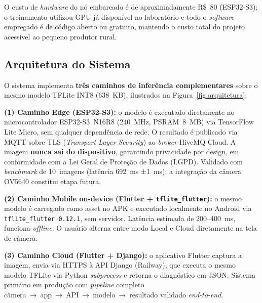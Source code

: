 \documentclass[12pt]{article}
\begin{document}
O custo de \textit{hardware} do nó embarcado é de aproximadamente R\$~80 (ESP32-S3);
o treinamento utilizou GPU já disponível no laboratório e todo o \textit{software}
empregado é de código aberto ou gratuito, mantendo o custo total do projeto acessível
ao pequeno produtor rural.

\subsection{Arquitetura do Sistema}

O sistema implementa \textbf{três caminhos de inferência complementares} sobre o
mesmo modelo TFLite INT8 (638~KB), ilustrados na Figura~\ref{fig:arquitetura}:

\textbf{(1) Caminho Edge (ESP32-S3):} o modelo é executado diretamente no
microcontrolador ESP32-S3~N16R8 (240~MHz, PSRAM~8~MB) via TensorFlow Lite Micro,
sem qualquer dependência de rede. O resultado é publicado via MQTT sobre TLS
(\textit{Transport Layer Security}) ao \textit{broker} HiveMQ Cloud. A imagem
\textbf{nunca sai do dispositivo}, garantindo privacidade por design, em conformidade
com a Lei Geral de Proteção de Dados (LGPD). Validado com \textit{benchmark} de
10~imagens (latência 692~ms ±1~ms);
a integração da câmera OV5640 constitui etapa futura.

\textbf{(2) Caminho Mobile on-device (Flutter + \texttt{tflite\_flutter}):} o
mesmo modelo é carregado como asset no APK e executado localmente no Android via
\texttt{tflite\_flutter~0.12.1}, sem servidor. Latência estimada de 200--400~ms,
funciona \textit{offline}. O usuário alterna entre modo Local e Cloud diretamente
na tela de câmera.

\textbf{(3) Caminho Cloud (Flutter + Django):} o aplicativo Flutter captura a
imagem, envia via HTTPS à API Django (Railway), que executa o mesmo modelo TFLite
via Python \textit{subprocess} e retorna o diagnóstico em JSON. Sistema primário em
produção com \textit{pipeline} completo câmera~→~app~→~API~→~modelo~→~resultado
validado \textit{end-to-end}.
\end{document}
